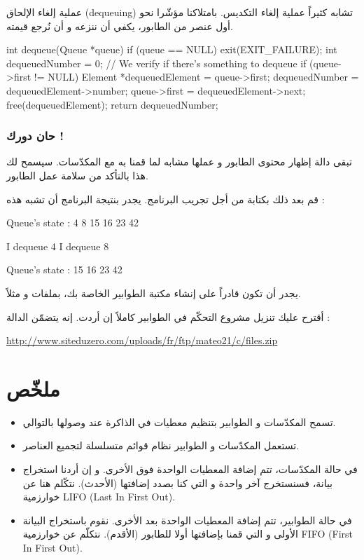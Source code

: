 عملية إلغاء الإلحاق 
(\textenglish{dequeuing})
تشابه كثيراً عملية إلغاء التكديس. بامتلاكنا مؤشّرا نحو أول عنصر من الطابور، يكفي أن ننزعه و أن نُرجع قيمته.

\begin{Csource}
int dequeue(Queue *queue)
{
	if (queue == NULL)
	{
		exit(EXIT_FAILURE);
	}
	int dequeuedNumber = 0;
	// We verify if there's something to dequeue
	if (queue->first != NULL)
	{
		Element *dequeuedElement = queue->first;
		dequeuedNumber = dequeuedElement->number;
		queue->first = dequeuedElement->next;
		free(dequeuedElement);
	}
	return dequeuedNumber;
}
\end{Csource}

\subsubsection{حان دورك !}

تبقى دالة إظهار محتوى الطابور
و عملها مشابه لما قمنا به مع المكدّسات. سيسمح لك هذا بالتأكد من سلامة عمل الطابور.

قم بعد ذلك بكتابة
من أجل تجريب البرنامج. يجدر بنتيجة البرنامج أن تشبه هذه :

\begin{Console}
Queue's state :
4 8 15 16 23 42

I dequeue 4
I dequeue 8

Queue's state :
15 16 23 42
\end{Console}

يجدر أن تكون قادراً على إنشاء مكتبة الطوابير الخاصة بك، بملفات
و
مثلاً.

أقترح عليك تنزيل مشروع التحكّم في الطوابير كاملاً إن أردت. إنه يتضمّن الدالة
 :

\url{http://www.siteduzero.com/uploads/fr/ftp/mateo21/c/files.zip}

\section*{ملخّص}

\begin{itemize}
	\item تسمح المكدّسات و الطوابير بتنظيم معطيات في الذاكرة عند وصولها بالتوالي.
	\item تستعمل المكدّسات و الطوابير نظام قوائم متسلسلة لتجميع العناصر.
	\item في حالة المكدّسات، تتم إضافة المعطيات الواحدة فوق الأخرى. و إن أردنا استخراج بيانة، فسنستخرج آخر واحدة و التي كنا بصدد إضافتها (الأحدث). نتكّلم هنا عن خوارزمية 
	\textenglish{LIFO} (\textenglish{Last In First Out}).
	\item في حالة الطوابير، تتم إضافة المعطيات الواحدة بعد الأخرى. نقوم باستخراج البيانة الأولى و التي قمنا بإضافتها أولا للطابور (الأقدم). نتكلّم عن خوارزمية
	\textenglish{FIFO} (\textenglish{First In First Out}).
\end{itemize}
